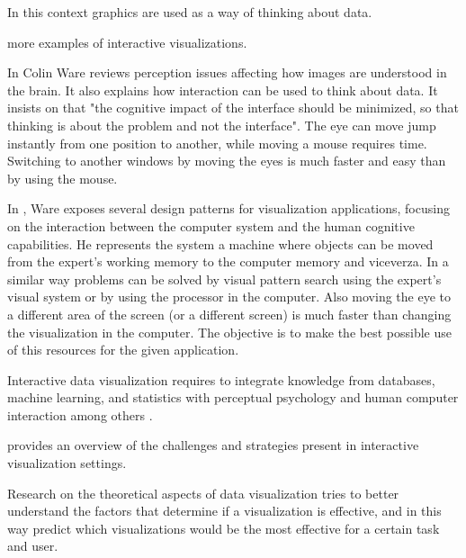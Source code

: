 In this context graphics are used as a way of thinking about data. 

\autocite{card_structure_1997}	more examples of interactive visualizations. 

In \autocite{ware_information_2004} Colin Ware reviews perception issues affecting how images are understood in the brain. It also explains how interaction can be used to think about data. It insists on that "the cognitive impact of the interface should be minimized, so that thinking is about the problem and not the interface". The eye can move jump instantly from one position to another, while moving a mouse requires time. Switching to another windows by moving the eyes is much faster and easy than by using the mouse.

		
In \autocite{ware_visual_2013}, Ware exposes several design patterns for visualization applications, focusing on the interaction between the computer system and the human cognitive capabilities. He represents the system a machine where objects can be moved from the expert's working memory to the computer memory and viceverza. In a similar way problems can be solved by visual pattern search using the expert's visual system or by using the processor in the computer. Also moving the eye to a different area of the screen (or a different screen) is much faster than changing the visualization in the computer.
The objective is to make the best possible use of this resources for the given application. 



Interactive data visualization requires to integrate knowledge from databases, machine learning, and statistics with perceptual psychology and human computer interaction among others \autocite{ward_interactive_2010}.






\autocite{spence_information_2007} provides an overview of the challenges and strategies present in interactive visualization settings.
	

Research on the theoretical aspects of data visualization \autocite{purchase_theoretical_2008} tries to better understand the factors that determine if a visualization is effective, and in this way predict which visualizations would be the most effective for a certain task and user.
	

